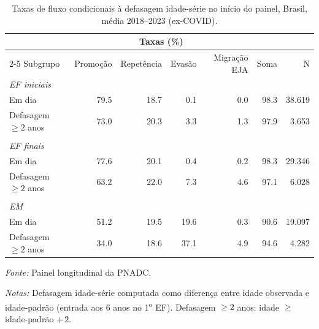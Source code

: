 \begin{table}[htbp]
\centering
\caption{Taxas de fluxo condicionais \`a defasagem idade-s\'erie no in\'icio do painel, Brasil, m\'edia 2018--2023 (ex-COVID).}
\label{tab:distorcao}
\begin{threeparttable}
\small
\begin{tabular}{lrrrrrr}
\toprule
& \multicolumn{4}{c}{Taxas (\%)} & & \\
\cmidrule(lr){2-5}
Subgrupo & Promo\c{c}\~ao & Repet\^encia & Evas\~ao & Migra\c{c}\~ao EJA & Soma & N \\
\midrule
\multicolumn{7}{l}{\textit{EF iniciais}} \\
\midrule
Em dia & 79.5 & 18.7 & 0.1 & 0.0 & 98.3 & 38.619 \\
Defasagem $\geq 2$ anos & 73.0 & 20.3 & 3.3 & 1.3 & 97.9 & 3.653 \\
\\[0.3em]
\multicolumn{7}{l}{\textit{EF finais}} \\
\midrule
Em dia & 77.6 & 20.1 & 0.4 & 0.2 & 98.3 & 29.346 \\
Defasagem $\geq 2$ anos & 63.2 & 22.0 & 7.3 & 4.6 & 97.1 & 6.028 \\
\\[0.3em]
\multicolumn{7}{l}{\textit{EM}} \\
\midrule
Em dia & 51.2 & 19.5 & 19.6 & 0.3 & 90.6 & 19.097 \\
Defasagem $\geq 2$ anos & 34.0 & 18.6 & 37.1 & 4.9 & 94.6 & 4.282 \\
\bottomrule
\end{tabular}
\begin{tablenotes}\footnotesize
\item \textit{Fonte:} Painel longitudinal da PNADC.
\item \textit{Notas:} Defasagem idade-s\'erie computada como diferen\c{c}a entre idade observada e idade-padr\~ao (entrada aos 6 anos no 1\textsuperscript{o} EF). Defasagem $\geq 2$ anos: idade $\geq$ idade-padr\~ao $+\,2$.
\end{tablenotes}
\end{threeparttable}
\end{table}
